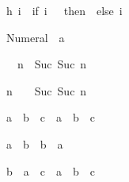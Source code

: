 \begin{isabellebody}
{}h\ i\ {}\ {}if\ i\ {}\ {}\ then\ {}\ else\ i{}{}%
\begin{isamarkuptext}%
%
\end{isamarkuptext}%
\isamarkuptrue%
%
\begin{isamarkuptext}%
\begin{isabelle}%
Numeral{}\ {}\ {}{}{}{}a{}%
\end{isabelle}

\begin{isabelle}%
{}\ {}\ n\ {}\ Suc\ {}Suc\ n{}%
\end{isabelle}

\begin{isabelle}%
n\ {}\ {}\ {}\ Suc\ {}Suc\ n{}%
\end{isabelle}

\begin{isabelle}%
a\ {}\ b\ {}\ c\ {}\ a\ {}\ {}b\ {}\ c{}%
\end{isabelle}

\begin{isabelle}%
a\ {}\ b\ {}\ b\ {}\ a%
\end{isabelle}

\begin{isabelle}%
b\ {}\ {}a\ {}\ c{}\ {}\ a\ {}\ {}b\ {}\ c{}%
\end{isabelle}


\end{isamarkuptext}
\end{isabellebody}

